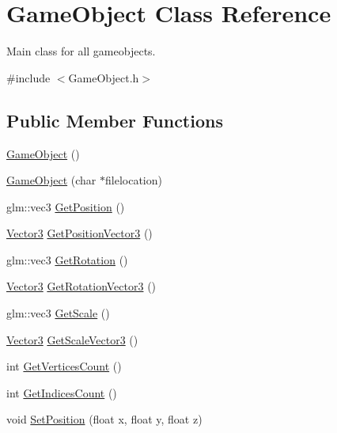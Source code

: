 \hypertarget{class_game_object}{}\section{Game\+Object Class Reference}
\label{class_game_object}


Main class for all gameobjects.  




{\ttfamily \#include $<$Game\+Object.\+h$>$}

\subsection*{Public Member Functions}
\begin{DoxyCompactItemize}
\item 
\mbox{\hyperlink{class_game_object_a0348e3ee2e83d56eafca7a3547f432c4}{Game\+Object}} ()
\item 
\mbox{\hyperlink{class_game_object_a2a40f6eac86bddffbf44d86f1fcb93ec}{Game\+Object}} (char $\ast$filelocation)
\item 
glm\+::vec3 \mbox{\hyperlink{class_game_object_a345efa82c1b4d5f41100f267ee859dae}{Get\+Position}} ()
\item 
\mbox{\hyperlink{struct_vector3}{Vector3}} \mbox{\hyperlink{class_game_object_a4541e1e1f7461f91878e7ddc1a145d89}{Get\+Position\+Vector3}} ()
\item 
glm\+::vec3 \mbox{\hyperlink{class_game_object_ac37ee5e22d3f9a0dc1ddb3ad8f5aea0e}{Get\+Rotation}} ()
\item 
\mbox{\hyperlink{struct_vector3}{Vector3}} \mbox{\hyperlink{class_game_object_a271ece7ce9dcac2d1076754c96049dd0}{Get\+Rotation\+Vector3}} ()
\item 
glm\+::vec3 \mbox{\hyperlink{class_game_object_aac0681f3ee0d74b8d295df8fc53aeb52}{Get\+Scale}} ()
\item 
\mbox{\hyperlink{struct_vector3}{Vector3}} \mbox{\hyperlink{class_game_object_a508760ef156d3c6b48dc3ffe97b82ccb}{Get\+Scale\+Vector3}} ()
\item 
int \mbox{\hyperlink{class_game_object_a3c0c54e2ea7c46be00e6ba56fd23a605}{Get\+Vertices\+Count}} ()
\item 
int \mbox{\hyperlink{class_game_object_a5f11058ab58b1e3fd0bba65eca1dad4a}{Get\+Indices\+Count}} ()
\item 
void \mbox{\hyperlink{class_game_object_afb69dab3e8f30a0be83c1d4b554ed275}{Set\+Position}} (float x, float y, float z)
\item 

\end{DoxyCompactItemize}
